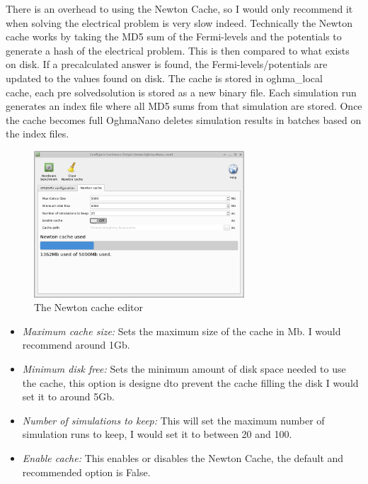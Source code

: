 There is an overhead to using the Newton Cache, so I would only recommend it when solving the electrical problem is very slow indeed. Technically the Newton cache works by taking the MD5 sum of the Fermi-levels and the potentials to generate a hash of the electrical problem. This is then compared to what exists on disk. If a precalculated answer is found, the Fermi-levels/potentials are updated to the values found on disk. The cache is stored in oghma\_local\\cache, each pre solvedsolution is stored as a new binary file. Each simulation run generates an index file where all MD5 sums from that simulation are stored. Once the cache becomes full OghmaNano deletes simulation results in batches based on the index files.

\begin{figure}[H]
\centering
\includegraphics[width=0.7\textwidth,height=0.5\textwidth]{./images/hardware/newton.png}
\caption{The Newton cache editor}
\label{fig:newton_cache_editor}
\end{figure}


	\begin{itemize}
		\vspace{-0.2cm}\item \emph{Maximum cache size:} Sets the maximum size of the cache in Mb. I would recommend around 1Gb.
		\vspace{-0.2cm}\item \emph{Minimum disk free:} Sets the minimum amount of disk space needed to use the cache, this option is designe dto prevent the cache filling the disk I would set it to around 5Gb.
 		\vspace{-0.2cm}\item \emph{Number of simulations to keep:} This will set the maximum number of simulation runs to keep, I would set it to between 20 and 100.
 		\vspace{-0.2cm}\item \emph{Enable cache:} This enables or disables the Newton Cache, the default and recommended option is False.
	\end{itemize}

